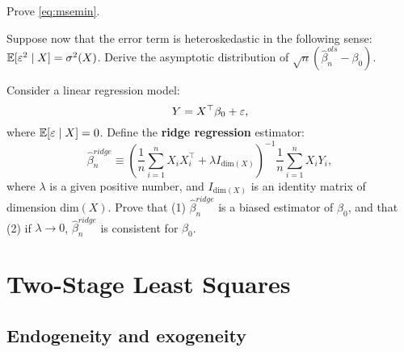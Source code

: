 \documentclass[11pt, A4paper, openany, uplatex]{book}
\begin{document}
\hrulefill
\begin{exercise}\upshape
	Prove \eqref{eq:msemin}.
\end{exercise}
\begin{exercise}\upshape
	Suppose now that the error term is heteroskedastic in the following sense: $\mathbb{E}[\varepsilon^2 \mid X] = \sigma^2(X)$.
	Derive the asymptotic distribution of $\sqrt{n}(\hat \beta_n^{ols} - \beta_0)$.
\end{exercise}
\begin{exercise}\upshape
	Consider a linear regression model:
	\[
	Y = X^\top \beta_0 + \varepsilon,
	\]
	where $\mathbb{E}[\varepsilon \mid X] = 0$.
	Define the \textbf{ridge regression} estimator:
	\[
	\hat \beta_n^{ridge} \equiv \left(\frac{1}{n}\sum_{i = 1}^n X_i X_i^\top + \lambda I_{\text{dim}(X)} \right)^{-1}\frac{1}{n}\sum_{i = 1}^n X_i Y_i,
	\]
	where $\lambda$ is a given positive number, and $I_{\text{dim}(X)}$ is an identity matrix of dimension $\text{dim}(X)$.
	Prove that (1) $\hat \beta_n^{ridge}$ is a biased estimator of $\beta_0$, and that (2) if $\lambda \to 0$, $\hat \beta_n^{ridge}$ is consistent for $\beta_0$.
\end{exercise}


\chapter{Two-Stage Least Squares}\label{chap:2sls}
\section{Endogeneity and exogeneity}
\end{document}
